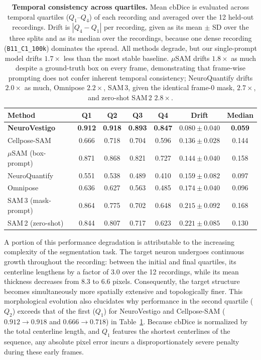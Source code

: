 \documentclass[11pt,a4paper]{article}
\begin{document}
\begin{table}[!htb]
\centering
\caption{\textbf{Temporal consistency across quartiles.} Mean cbDice is
evaluated across temporal quartiles ($Q_1$--$Q_4$) of each recording and
averaged over the 12 held-out recordings. Drift is $|Q_4 - Q_1|$ per
recording, given as its mean $\pm$ SD over the three splits and as its median
over the recordings, because one dense recording (\texttt{B11\_C1\_100k})
dominates the spread. All methods degrade, but our single-prompt model drifts
$1.7\times$ less than the most stable baseline. $\mu$SAM drifts $1.8\times$
as much despite a ground-truth box on every frame, demonstrating that
frame-wise prompting does not confer inherent temporal consistency;
NeuroQuantify drifts $2.0\times$ as much, Omnipose $2.2\times$, SAM\,3, given
the identical frame-0 mask, $2.7\times$, and zero-shot SAM\,2 $2.8\times$.}
\label{tab:drift}
\small
\begin{tabular}{lcccccc}
\toprule
Method & Q1 & Q2 & Q3 & Q4 & Drift & Median \\
\midrule
\textbf{NeuroVestigo}            & \textbf{0.912} & \textbf{0.918} & \textbf{0.893} & \textbf{0.847} & $\mathbf{0.080}\pm0.040$ & \textbf{0.059} \\
Cellpose-SAM             & 0.666 & 0.718 & 0.704 & 0.596 & $0.136\pm0.028$ & 0.144 \\
$\mu$SAM (box-prompt)    & 0.871 & 0.868 & 0.821 & 0.727 & $0.144\pm0.040$ & 0.158 \\
NeuroQuantify            & 0.551 & 0.538 & 0.489 & 0.410 & $0.159\pm0.082$ & 0.097 \\
Omnipose                 & 0.636 & 0.627 & 0.563 & 0.485 & $0.174\pm0.040$ & 0.096 \\
SAM\,3 (mask-prompt)     & 0.864 & 0.775 & 0.702 & 0.648 & $0.215\pm0.092$ & 0.168 \\
SAM\,2 (zero-shot)       & 0.844 & 0.807 & 0.717 & 0.623 & $0.221\pm0.085$ & 0.130 \\
\bottomrule
\end{tabular}
\end{table}


A portion of this performance degradation is attributable to the increasing
complexity of the segmentation task. The target neuron undergoes continuous
growth throughout the recording: between the initial and final quartiles, its
centerline lengthens by a factor of $3.0$ over the 12 recordings, while its
mean thickness decreases from $8.3$ to $6.6$ pixels. Consequently, the target structure becomes
simultaneously more spatially extensive and topologically finer. This
morphological evolution also elucidates why performance in the second
quartile ($Q_2$) exceeds that of the first ($Q_1$) for NeuroVestigo and
Cellpose-SAM ($0.912 \rightarrow 0.918$ and $0.666 \rightarrow 0.718$) in Table~\ref{tab:drift}. Because cbDice is normalized by the total
centerline length, and $Q_1$ features the shortest centerlines of the
sequence, any absolute pixel error incurs a disproportionately severe penalty
during these early frames.
\end{document}
